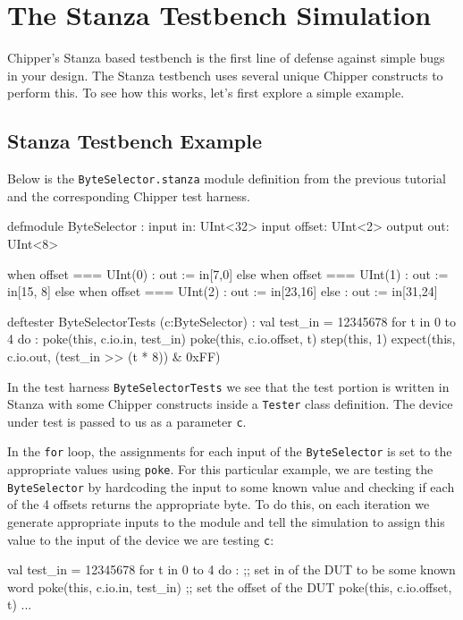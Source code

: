 \section{The Stanza Testbench Simulation}

Chipper's Stanza based testbench is the first line of defense against simple bugs in your design. The Stanza testbench uses several unique Chipper constructs to perform this. To see how this works, let's first explore a simple example.

\subsection{Stanza Testbench Example}

Below is the \verb+ByteSelector.stanza+ module definition from the previous tutorial and the corresponding Chipper test harness.

\begin{stanza}
defmodule ByteSelector :
  input  in:     UInt<32>
  input  offset: UInt<2>
  output out:    UInt<8>

  when offset === UInt(0) :
     out := in[7,0]
  else when offset === UInt(1) :
     out := in[15, 8]
  else when offset === UInt(2) :
     out := in[23,16]
  else :
     out := in[31,24]

deftester ByteSelectorTests (c:ByteSelector) :
  val test_in = 12345678
  for t in 0 to 4 do :
    poke(this, c.io.in,     test_in)
    poke(this, c.io.offset, t)
    step(this, 1)
    expect(this, c.io.out, (test_in >> (t * 8)) & 0xFF)
\end{stanza}

In the test harness \verb+ByteSelectorTests+ we see that the test portion is written in Stanza with some Chipper constructs inside a \verb+Tester+ class definition. The device under test is passed to us as a parameter \verb+c+. 

In the \verb+for+ loop, the assignments for each input of the \verb+ByteSelector+ is set to the appropriate values using \verb+poke+. For this particular example, we are testing the \verb+ByteSelector+ by hardcoding the input to some known value and checking if each of the 4 offsets returns the appropriate byte. To do this, on each iteration we generate appropriate inputs to the module and tell the simulation to assign this value to the input of the device we are testing \verb+c+:

\begin{stanza}
val test_in = 12345678
for t in 0 to 4 do :
  ;; set in of the DUT to be some known word
  poke(this, c.io.in,     test_in)
  ;; set the offset of the DUT
  poke(this, c.io.offset, t)
  ...
\end{stanza}

